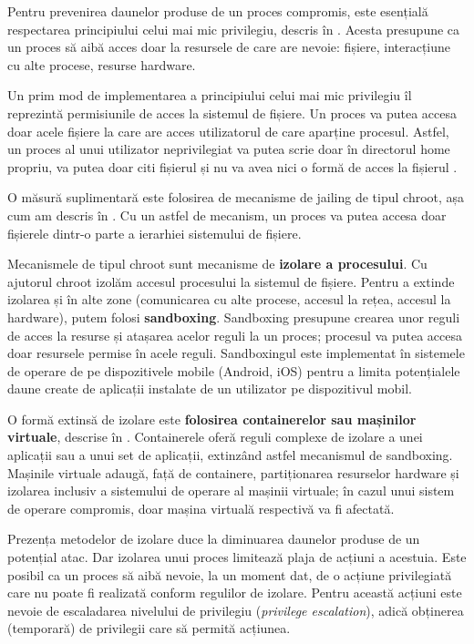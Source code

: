 Pentru prevenirea daunelor produse de un proces compromis, este esențială respectarea principiului celui mai mic privilegiu, descris în . Acesta presupune ca un proces să aibă acces doar la resursele de care are nevoie: fișiere, interacțiune cu alte procese, resurse hardware.

Un prim mod de implementarea a principiului celui mai mic privilegiu îl reprezintă permisiunile de acces la sistemul de fișiere. Un proces va putea accesa doar acele fișiere la care are acces utilizatorul de care aparține procesul. Astfel, un proces al unui utilizator neprivilegiat va putea scrie doar în directorul home propriu, va putea doar citi fișierul  și nu va avea nici o formă de acces la fișierul .

O măsură suplimentară este folosirea de mecanisme de jailing de tipul chroot, așa cum am descris în . Cu un astfel de mecanism, un proces va putea accesa doar fișierele dintr-o parte a ierarhiei sistemului de fișiere.

Mecanismele de tipul chroot sunt mecanisme de \textbf{izolare a procesului}. Cu ajutorul chroot izolăm accesul procesului la sistemul de fișiere. Pentru a extinde izolarea și în alte zone (comunicarea cu alte procese, accesul la rețea, accesul la hardware), putem folosi \textbf{sandboxing}. Sandboxing presupune crearea unor reguli de acces la resurse și atașarea acelor reguli la un proces; procesul va putea accesa doar resursele permise în acele reguli. Sandboxingul este implementat în sistemele de operare de pe dispozitivele mobile (Android, iOS) pentru a limita potențialele daune create de aplicații instalate de un utilizator pe dispozitivul mobil.

O formă extinsă de izolare este \textbf{folosirea containerelor sau mașinilor virtuale}, descrise în . Containerele oferă reguli complexe de izolare a unei aplicații sau a unui set de aplicații, extinzând astfel mecanismul de sandboxing. Mașinile virtuale adaugă, față de containere, partiționarea resurselor hardware și izolarea inclusiv a sistemului de operare al mașinii virtuale; în cazul unui sistem de operare compromis, doar mașina virtuală respectivă va fi afectată.

Prezența metodelor de izolare duce la diminuarea daunelor produse de un potențial atac. Dar izolarea unui proces limitează plaja de acțiuni a acestuia. Este posibil ca un proces să aibă nevoie, la un moment dat, de o acțiune privilegiată care nu poate fi realizată conform regulilor de izolare. Pentru această acțiuni este nevoie de escaladarea nivelului de privilegiu (\textit{privilege escalation}), adică obținerea (temporară) de privilegii care să permită acțiunea.

